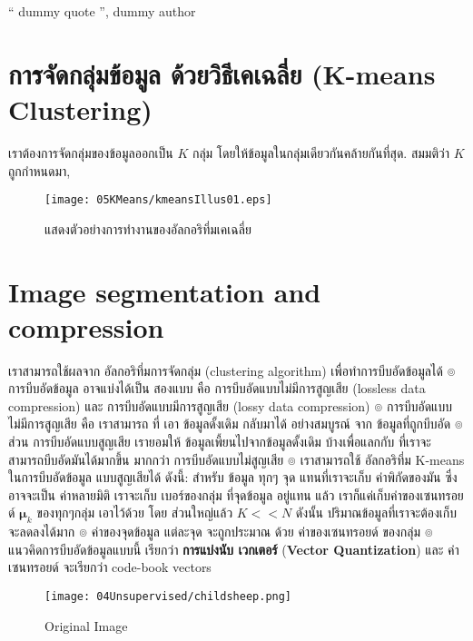 `` dummy quote '', dummy author

\section{การจัดกลุ่มข้อมูล ด้วยวิธีเคเฉลี่ย (K-means Clustering)}
\label{section: clustering}

เราต้องการจัดกลุ่มของข้อมูลออกเป็น $K$ กลุ่ม โดยให้ข้อมูลในกลุ่มเดียวกันคล้ายกันที่สุด.
สมมติว่า $K$ ถูกกำหนดมา,


%
\begin{figure}
\begin{center}
\texttt{[image: 05KMeans/kmeansIllus01.eps]}
\end{center}
\caption{แสดงตัวอย่างการทำงานของอัลกอริทึ่มเคเฉลี่ย}
\label{fig: kmeans illustration}
\end{figure}




\section{Image segmentation and compression}

เราสามารถใช้ผลจาก อัลกอริทึ่มการจัดกลุ่ม (clustering algorithm) เพื่อทำการบีบอัดข้อมูลได้
๏
การบีบอัดข้อมูล อาจแบ่งได้เป็น สองแบบ คือ การบีบอัดแบบไม่มีการสูญเสีย (lossless data compression) และ การบีบอัดแบบมีการสูญเสีย (lossy data compression)
๏
การบีบอัดแบบไม่มีการสูญเสีย คือ เราสามารถ ที่ เอา ข้อมูลดั้งเดิม กลับมาได้ อย่างสมบูรณ์ จาก ข้อมูลที่ถูกบีบอัด
๏
ส่วน การบีบอัดแบบสูญเสีย เรายอมให้ ข้อมูลเพี้ยนไปจากข้อมูลดั้งเดิม บ้างเพื่อแลกกับ ที่เราจะสามารถบีบอัดมันได้มากขึ้น มากกว่า การบีบอัดแบบไม่สูญเสีย
๏
เราสามารถใช้ อัลกอริทึ่ม K-means ในการบีบอัดข้อมูล แบบสูญเสียได้ ดังนี้:
สำหรับ ข้อมูล ทุกๆ จุด แทนที่เราจะเก็บ ค่าพิกัดของมัน ซึ่งอาจจะเป็น ค่าหลายมิติ เราจะเก็บ เบอร์ของกลุ่ม ที่จุดข้อมูล อยู่แทน
แล้ว เราก็แค่เก็บค่าของเซนทรอยด์ $\mathbf{\mu}_k$ ของทุกๆกลุ่ม เอาไว้ด้วย
โดย ส่วนใหญ่แล้ว $K << N$ ดังนั้น ปริมาณข้อมูลที่เราจะต้องเก็บจะลดลงได้มาก
๏
ค่าของจุดข้อมูล แต่ละจุด จะถูกประมาณ ด้วย ค่าของเซนทรอยด์ ของกลุ่ม
๏
แนวคิดการบีบอัดข้อมูลแบบนี้ เรียกว่า \textbf{การแบ่งนับ เวกเตอร์} (\textbf{Vector Quantization}) 
และ ค่าเซนทรอยด์ จะเรียกว่า code-book vectors


%
\begin{figure}
\begin{center}
\texttt{[image: 04Unsupervised/childsheep.png]}
\end{center}
\caption{Original Image}
\label{fig: original child sheep}
\end{figure}
%

